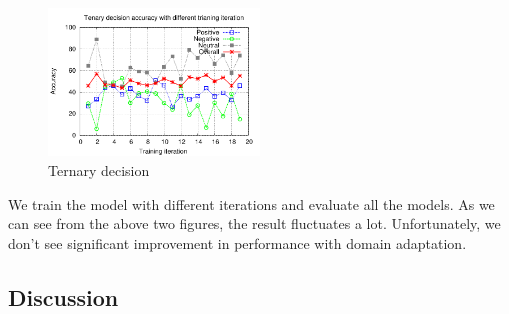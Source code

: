 \begin{itemize}
\begin{figure}[H]
\begin{center}
\includegraphics[width = 0.5\textwidth]{pic/model_3c.pdf}
\caption{Ternary decision }
\end{center}
\end{figure}

We train the model with different iterations and evaluate all the models. As we can see from the above two figures, the result fluctuates a lot. Unfortunately, we don't see significant improvement in performance with domain adaptation.  
\end{itemize}


\subsection{Discussion}
